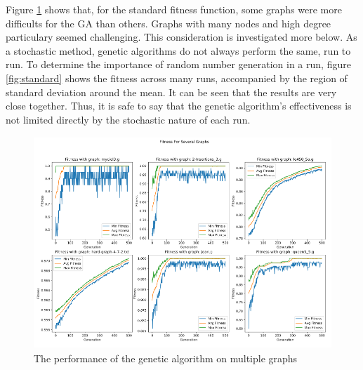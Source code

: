 \documentclass{article}
\begin{document}
	Figure \ref{fig:fitness} shows that, for the standard fitness function, some graphs were more difficults for the GA than others. Graphs with many nodes and high degree particulary seemed challenging. This consideration is investigated more below. As a stochastic method, genetic algorithms do not always perform the same, run to run. To determine the importance of random number generation in a run, figure \ref{fig:standard} shows the fitness across many runs, accompanied by the region of standard deviation around the mean. It can be seen that the results are very close together. Thus, it is safe to say that the genetic algorithm's effectiveness is not limited directly by the stochastic nature of each run.

	\begin{figure}
		\centering
		\includegraphics[width=12cm, height=8cm]{FitnessFigure.png}
		\caption{The performance of the genetic algorithm on multiple graphs}
		\label{fig:fitness}
	\end{figure}
\end{document}
